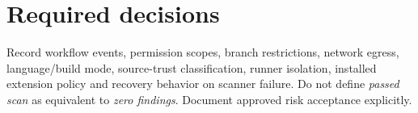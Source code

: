 \documentclass[10pt,letterpaper]{article}
\begin{document}
\section{Required decisions}
Record workflow events, permission scopes, branch restrictions, network egress, language/build mode, source-trust classification, runner isolation, installed extension policy and recovery behavior on scanner failure. Do not define \emph{passed scan} as equivalent to \emph{zero findings}. Document approved risk acceptance explicitly.
\end{document}
